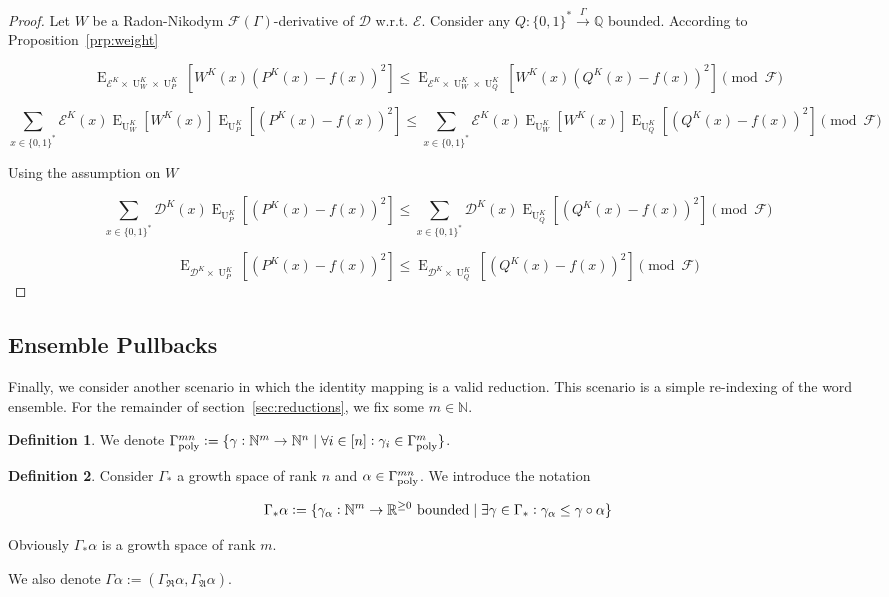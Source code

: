 \documentclass{article}
\numberwithin{equation}{section}
\theoremstyle{definition}
\newtheorem{definition}{Definition}[section]
\theoremstyle{plain}
\newcommand{\Bool}{\{0,1\}}
\newcommand{\Words}{{\Bool^*}}
\DeclareMathOperator{\E}{E}
\DeclareMathOperator{\Un}{U}
\newcommand{\Nats}{\mathbb{N}}
\newcommand{\Rats}{\mathbb{Q}}
\newcommand{\Reals}{\mathbb{R}}
\newcommand{\Dist}{\mathcal{D}}
\newcommand{\GrowR}{\Gamma_{\mathfrak{R}}}
\newcommand{\GrowA}{\Gamma_{\mathfrak{A}}}
\newcommand{\Fall}{\mathcal{F}}
\newcommand{\EG}{\Fall(\Gamma)}
\newcommand{\GammaPoly}{\Gamma_{\textnormal{poly}}}
\newcommand{\Scheme}{\xrightarrow{\Gamma}}
\begin{document}
\begin{proof}

Let ${W}$ be a Radon-Nikodym ${\EG}$-derivative of ${\Dist}$ w.r.t. ${\mathcal{E}}$. Consider any ${Q: \Words \Scheme \Rats}$ bounded. According to Proposition~\ref{prp:weight}

\[\E_{\mathcal{E}^{K} \times \Un_W^K \times \Un_P^K}[W^K(x)(P^K(x)-f(x))^2] \leq \E_{\mathcal{E}^{K} \times \Un_W^K \times \Un_Q^K}[W^K(x)(Q^K(x)-f(x))^2] \pmod \Fall\]

\[\sum_{x \in \Words} \mathcal{E}^{K}(x) \E_{\Un_W^K}[W^K(x)] \E_{\Un_P^K}[(P^K(x)-f(x))^2] \leq \sum_{x \in \Words} \mathcal{E}^{K}(x) \E_{\Un_W^K}[W^K(x)] \E_{\Un_Q^K}[(Q^K(x)-f(x))^2] \pmod \Fall\]

Using the assumption on ${W}$

\[\sum_{x \in \Words} \Dist^{K}(x) \E_{\Un_P^K}[(P^K(x)-f(x))^2] \leq \sum_{x \in \Words} \Dist^{K}(x) \E_{\Un_Q^K}[(Q^K(x)-f(x))^2] \pmod \Fall\]

\[\E_{\Dist^{K} \times \Un_P^K}[(P^K(x)-f(x))^2] \leq \E_{\Dist^{K} \times \Un_Q^K}[(Q^K(x)-f(x))^2] \pmod \Fall\]
%
\end{proof}

\subsection{Ensemble Pullbacks}

Finally, we consider another scenario in which the identity mapping is a valid reduction. This scenario is a simple re-indexing of the word ensemble. For the remainder of section~\ref{sec:reductions}, we fix some ${m \in \Nats}$.

\begin{samepage}
\begin{definition}

We denote ${\GammaPoly^{mn}:=\{\gamma: \Nats^m \rightarrow \Nats^n \mid \forall i \in [n]: \gamma_i \in \GammaPoly^m \}}$.

\end{definition}
\end{samepage}

\begin{samepage}
\begin{definition}

Consider ${\Gamma_*}$ a growth space of rank ${n}$ and ${\alpha \in \GammaPoly^{mn}}$. We introduce the notation

\begin{equation}
\label{eqn:tbd}
\Gamma_*\alpha:=\{\gamma_\alpha: \Nats^m \rightarrow \Reals^{\geq 0} \textnormal{ bounded} \mid \exists \gamma \in \Gamma_*: \gamma_\alpha \leq \gamma \circ \alpha\}
\end{equation}

Obviously ${\Gamma_*\alpha}$ is a growth space of rank ${m}$.

We also denote ${\Gamma \alpha := (\GrowR \alpha, \GrowA \alpha)}$.

\end{definition}
\end{samepage}
\end{document}
